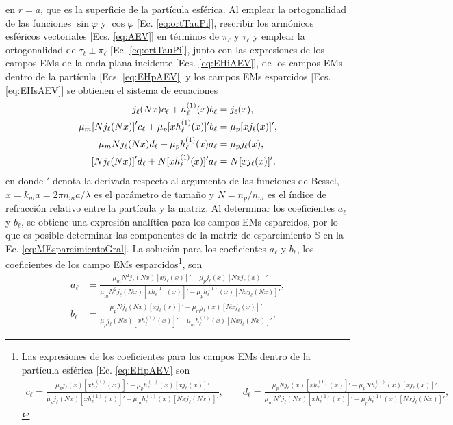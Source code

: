 \documentclass[letterpaper,11pt] {article}
\begin{document}
\noindent
en $r =a$, que es la superficie de la partícula esférica. Al emplear la ortogonalidad de las funciones $\sin\varphi$ y $\cos\varphi$ [Ec. \eqref{eq:ortTauPi}], rescribir los armónicos esféricos vectoriales [Ecs. \eqref{eq:AEV}] en términos de $\pi_\ell$ y $\tau_\ell$ y emplear la ortogonalidad de $\tau_\ell\pm\pi_\ell$ [Ec. \eqref{eq:ortTauPi}], junto con las expresiones de los campos EMs de la onda plana incidente [Ecs. \eqref{eq:EHiAEV}], de los campos EMs dentro de la partícula [Ecs. \eqref{eq:EHpAEV}] y los campos EMs esparcidos [Ecs. \eqref{eq:EHsAEV}] se obtienen el sistema de ecuaciones
	\begin{align*}
	j_\ell(Nx)c_\ell + h_\ell^{(1)}(x)b_\ell &= j_\ell(x),\\
	\mu_m\qty[Nj_\ell(Nx)]'c_\ell + \mu_p [xh_\ell^{(1)}(x)]'b_\ell &= \mu_p [xj_\ell(x)]',\\
	\mu_m N j_\ell(Nx)d_\ell +\mu_p h_\ell^{(1)}(x)a_\ell &=\mu_p j_\ell(x),\\
	\qty[Nj_\ell(Nx)]'d_\ell + N [xh_\ell^{(1)}(x)]'a_\ell &= N [xj_\ell(x)]',
	\end{align*}
en donde $'$ denota la derivada respecto al argumento de las funciones de Bessel, $x = k_m a = 2 \pi n_m a /\lambda$ es el parámetro de tamaño y $N = n_p / n_m$ es el índice de refracción relativo entre la partícula y la matriz. Al determinar los coeficientes $a_\ell$ y $b_\ell$, se obtiene una expresión analítica para los campos EMs esparcidos, por lo que es posible determinar las componentes de la matriz de esparcimiento $\mathbb{S}$ en la Ec. \eqref{eq:MEsparcimientoGral}. La solución para los coeficientes $a_\ell$ y $b_\ell$, los coeficientes de los campo EMs esparcidos\footnote{Las expresiones de los coeficientes para los campos EMs dentro de la partícula esférica [Ec. \eqref{eq:EHpAEV} son
	\begin{align*}
	c_\ell = \frac{\mu_p j_\ell(x)[xh_\ell^{(1)}(x)]' - \mu_p h_\ell^{(1)}(x) [xj_\ell(x)]'}
				{\mu_pj_\ell(Nx) [xh_\ell^{(1)}(x)]'-\mu_m h_\ell^{(1)}(x) [N x j_\ell(Nx)]' },
	\qquad	
	d_\ell = \frac{\mu_p N j_\ell(x)[xh_\ell^{(1)}(x)]' - \mu_p N h_\ell^{(1)}(x) [xj_\ell(x)]'}
				{\mu_m N^2 j_\ell(Nx) [xh_\ell^{(1)}(x)]'-\mu_p h_\ell^{(1)}(x) [N x j_\ell(Nx)]' }	,
	\end{align*}}, son
	\begin{subequations}\begin{align}
	a_\ell &= \frac{\mu_m N^2 j_\ell(Nx)[xj_\ell(x)]' - \mu_p j_\ell(x) [Nxj_\ell(x)]'}
				{\mu_mN^2j_\ell(Nx) [xh_\ell^{(1)}(x)]'-\mu_p h_\ell^{(1)}(x) [N x j_\ell(Nx)]' },
	\label{eq:a_ellFULL}\\
	b_\ell &= \frac{\mu_p N j_\ell(Nx)[xj_\ell(x)]' - \mu_m j_\ell(x) [Nxj_\ell(x)]'}
				{\mu_p j_\ell(Nx) [xh_\ell^{(1)}(x)]'-\mu_m h_\ell^{(1)}(x) [N x j_\ell(Nx)]' },
	\label{eq:b_ellFULL}			
	\end{align}\label{eq:MieCoefScattFULL}\end{subequations}
\end{document}
